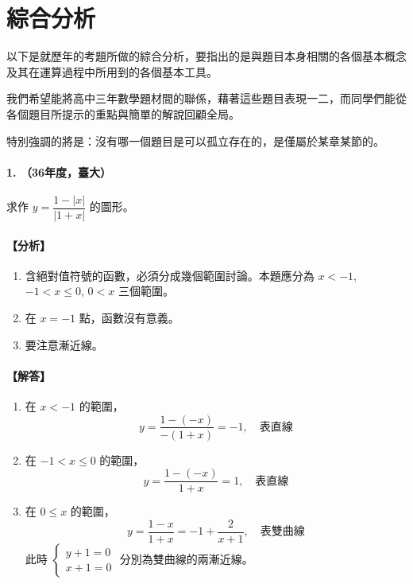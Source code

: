\section{綜合分析}\label{sec:b6-ch4}\label{sec:b6-4}

以下是就歷年的考題所做的綜合分析，要指出的是與題目本身相關的各個基本概念及其在運算過程中所用到的各個基本工具。

我們希望能將高中三年數學題材間的聯係，藉著這些題目表現一二，而同學們能從各個題目所提示的重點與簡單的解說回顧全局。

特別強調的將是：沒有哪一個題目是可以孤立存在的，是僅屬於某章某節的。


\paragraph{1. （36年度，臺大）}
求作 $y = \dfrac{1-|x|}{|1+x|}$ 的圖形。

\paragraph{【分析】}
\begin{enumerate}[label=(\arabic*), leftmargin=2em]
  \item 含絕對值符號的函數，必須分成幾個範圍討論。本題應分為 $x<-1$, $-1<x\le 0$, $0<x$ 三個範圍。
  \item 在 $x=-1$ 點，函數沒有意義。
  \item 要注意漸近線。
\end{enumerate}

\paragraph{【解答】}
\begin{enumerate}[label=(\arabic*), leftmargin=2em]
  \item 在 $x<-1$ 的範圍，
  \[ y = \dfrac{1-(-x)}{-(1+x)} = -1, \quad \text{表直線} \]
  \item 在 $-1<x\le 0$ 的範圍，
  \[ y = \dfrac{1-(-x)}{1+x} = 1, \quad \text{表直線} \]
  \item 在 $0\le x$ 的範圍，
  \[ y = \dfrac{1-x}{1+x} = -1 + \dfrac{2}{x+1}, \quad \text{表雙曲線} \]
  此時 $\begin{cases} y+1=0 \\ x+1=0 \end{cases}$ 分別為雙曲線的兩漸近線。
\end{enumerate}

